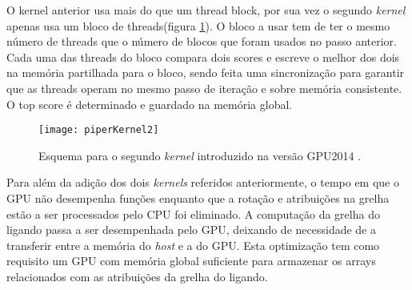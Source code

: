 O kernel anterior usa mais do que um thread block, por sua vez o segundo \textit{kernel} apenas usa um bloco de threads(figura \ref{k2piper}). O bloco a usar tem de ter o mesmo número de threads que o número de blocos que foram usados no passo anterior. Cada uma das threads do bloco compara dois scores e escreve o melhor dos dois na memória partilhada para o bloco, sendo feita uma sincronização para garantir que as threads operam no mesmo passo de iteração e sobre memória consistente. O top score é determinado e guardado na memória global. \par
 \begin{figure}[ht]
  \centering
    {\texttt{[image: piperKernel2]}}
  \caption{Esquema para o segundo \textit{kernel} introduzido na versão GPU2014 \cite{piper2014gpu}. }
  \label{k2piper}
\end{figure}
Para além da adição dos dois \textit{kernels} referidos anteriormente, o tempo em que o GPU não desempenha funções enquanto que a rotação e atribuições na grelha estão a ser processados pelo CPU foi eliminado. A computação da grelha do ligando passa a ser desempenhada pelo GPU, deixando de necessidade de a transferir entre a memória do \textit{host} e a do GPU. Esta optimização tem como requisito um GPU com memória global suficiente para armazenar os arrays relacionados com as atribuições da grelha do ligando. \par
